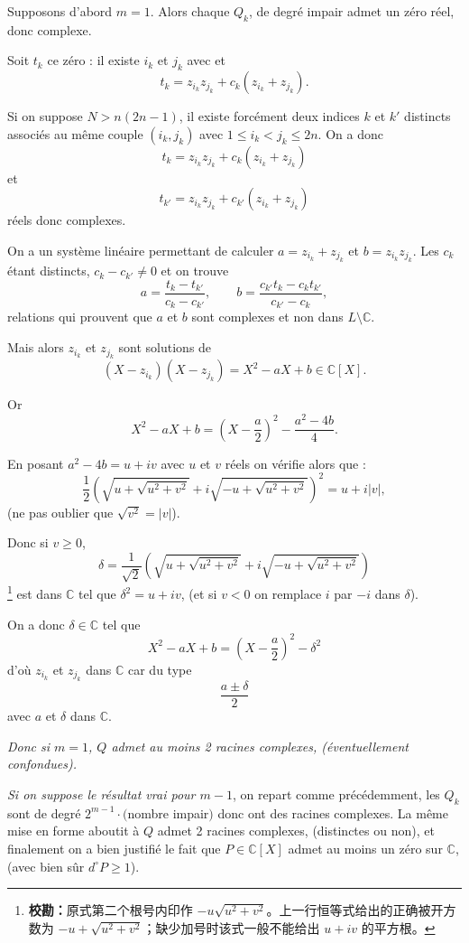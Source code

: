 Supposons d'abord $m=1$. Alors chaque $Q_k$, de degré impair admet un zéro réel, donc complexe.

Soit $t_k$ ce zéro : il existe $i_k$ et $j_k$ avec  et
\[
t_k=z_{i_k}z_{j_k}+c_k(z_{i_k}+z_{j_k}).
\]

Si on suppose $N>n(2n-1)$, il existe forcément deux indices $k$ et $k'$ distincts associés au même couple $(i_k,j_k)$ avec $1\le i_k<j_k\le2n$. On a donc
\[
t_k=z_{i_k}z_{j_k}+c_k(z_{i_k}+z_{j_k})
\]
et
\[
t_{k'}=z_{i_k}z_{j_k}+c_{k'}(z_{i_k}+z_{j_k})
\]
réels donc complexes.

On a un système linéaire permettant de calculer $a=z_{i_k}+z_{j_k}$ et $b=z_{i_k}z_{j_k}$. Les $c_k$ étant distincts, $c_k-c_{k'}\ne0$ et on trouve
\[
a=\frac{t_k-t_{k'}}{c_k-c_{k'}},
\qquad
b=\frac{c_{k'}t_k-c_kt_{k'}}{c_{k'}-c_k},
\]
relations qui prouvent que $a$ et $b$ sont complexes et non dans $L\setminus\mathbb C$.

Mais alors $z_{i_k}$ et $z_{j_k}$ sont solutions de
\[
(X-z_{i_k})(X-z_{j_k})=X^2-aX+b\in\mathbb C[X].
\]

Or
\[
X^2-aX+b=\left(X-\frac a2\right)^2-\frac{a^2-4b}{4}.
\]

En posant $a^2-4b=u+iv$ avec $u$ et $v$ réels on vérifie alors que :
\[
\frac12\left(\sqrt{u+\sqrt{u^2+v^2}}+i\sqrt{-u+\sqrt{u^2+v^2}}\right)^2=u+i|v|,
\]
(ne pas oublier que $\sqrt{v^2}=|v|$).

Donc si $v\ge0$,
\[
\delta=\frac1{\sqrt2}\left(\sqrt{u+\sqrt{u^2+v^2}}+i\sqrt{-u+\sqrt{u^2+v^2}}\right)
\]
\footnote{\textbf{校勘：}原式第二个根号内印作 $-u\sqrt{u^2+v^2}$。上一行恒等式给出的正确被开方数为 $-u+\sqrt{u^2+v^2}$；缺少加号时该式一般不能给出 $u+iv$ 的平方根。}
est dans $\mathbb C$ tel que $\delta^2=u+iv$, (et si $v<0$ on remplace $i$ par $-i$ dans $\delta$).

On a donc $\delta\in\mathbb C$ tel que
\[
X^2-aX+b=\left(X-\frac a2\right)^2-\delta^2
\]
d'où $z_{i_k}$ et $z_{j_k}$ dans $\mathbb C$ car du type
\[
\frac{a\pm\delta}{2}
\]
avec $a$ et $\delta$ dans $\mathbb C$.

\emph{Donc si $m=1$, $Q$ admet au moins 2 racines complexes, (éventuellement confondues).}

\emph{Si on suppose le résultat vrai pour $m-1$}, on repart comme précédemment, les $Q_k$ sont de degré $2^{m-1}\cdot($nombre impair$)$ donc ont des racines complexes. La même mise en forme aboutit à $Q$ admet 2 racines complexes, (distinctes ou non), et finalement on a bien justifié le fait que $P\in\mathbb C[X]$ admet au moins un zéro sur $\mathbb C$, (avec bien sûr $d^\circ P\ge1$).

